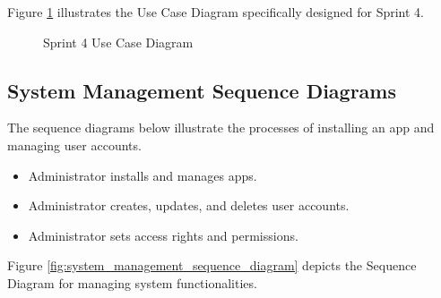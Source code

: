 Figure \ref{fig:sprint4_use_case_diagram} illustrates the Use Case Diagram specifically designed for Sprint 4.

\begin{figure}[h]
    \centering
    \caption{Sprint 4 Use Case Diagram}
    \label{fig:sprint4_use_case_diagram}
\end{figure}

\subsection{System Management Sequence Diagrams}
The sequence diagrams below illustrate the processes of installing an app and managing user accounts.

\begin{itemize}
    \item Administrator installs and manages apps.
    \item Administrator creates, updates, and deletes user accounts.
    \item Administrator sets access rights and permissions.
\end{itemize}

Figure \ref{fig:system_management_sequence_diagram} depicts the Sequence Diagram for managing system functionalities.

